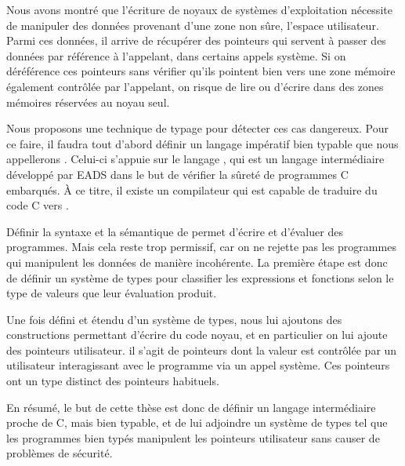 
Nous avons montré que l'écriture de noyaux de systèmes d'exploitation nécessite
de manipuler des données provenant d'une zone non sûre, l'espace utilisateur.
Parmi ces données, il arrive de récupérer des pointeurs qui servent à passer des
données par référence à l'appelant, dans certains appels système. Si on
déréférence ces pointeurs sans vérifier qu'ils pointent bien vers une zone
mémoire également contrôlée par l'appelant, on risque de lire ou d'écrire dans
des zones mémoires réservées au noyau seul.

Nous proposons une technique de typage pour détecter ces cas dangereux. Pour ce
faire, il faudra tout d'abord définir un langage impératif bien typable que nous
appellerons \langname.
Celui-ci s'appuie sur le langage \newspeak, qui est un langage intermédiaire
développé par EADS dans le but de vérifier la sûreté de programmes C embarqués.
À ce titre, il existe un compilateur qui est capable de traduire du code C vers
\newspeak.

Définir la syntaxe et la sémantique de \langname permet d'écrire et d'évaluer
des programmes. Mais cela reste trop permissif, car on ne rejette pas les
programmes qui manipulent les données de manière incohérente. La première étape
est donc de définir un système de types pour classifier les expressions et
fonctions selon le type de valeurs que leur évaluation produit.

Une fois \langname défini et étendu d'un système de types, nous lui ajoutons des
constructions permettant d'écrire du code noyau, et en particulier on lui ajoute
des pointeurs utilisateur. il s'agit de pointeurs dont la valeur est contrôlée
par un utilisateur interagissant avec le programme via un appel système. Ces
pointeurs ont un type distinct des pointeurs habituels.

En résumé, le but de cette thèse est donc de définir un langage intermédiaire
proche de C, mais bien typable, et de lui adjoindre un système de types tel que
les programmes bien typés manipulent les pointeurs utilisateur sans causer de
problèmes de sécurité.

